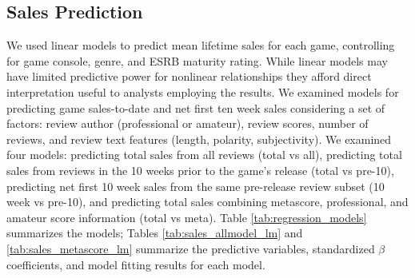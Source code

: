 \documentclass[letterpaper]{article}
\begin{document}
\subsection{Sales Prediction}
We used linear models to predict mean lifetime sales for each game, controlling for game console, genre, and ESRB maturity rating. While linear models may have limited predictive power for nonlinear relationships they afford direct interpretation useful to analysts employing the results. We examined models for predicting game sales-to-date and net first ten week sales considering a set of factors: review author (professional or amateur), review scores, number of reviews, and review text features (length, polarity, subjectivity). We examined four models: predicting total sales from all reviews (total vs all), predicting total sales from reviews in the 10 weeks prior to the game's release (total vs pre-10), predicting net first 10 week sales from the same pre-release review subset (10 week vs pre-10), and predicting total sales combining metascore, professional, and amateur score information (total vs meta). Table \ref{tab:regression_models} summarizes the models; Tables \ref{tab:sales_allmodel_lm} and \ref{tab:sales_metascore_lm} summarize the predictive variables, standardized $\beta$ coefficients, and model fitting results for each model.
\end{document}
